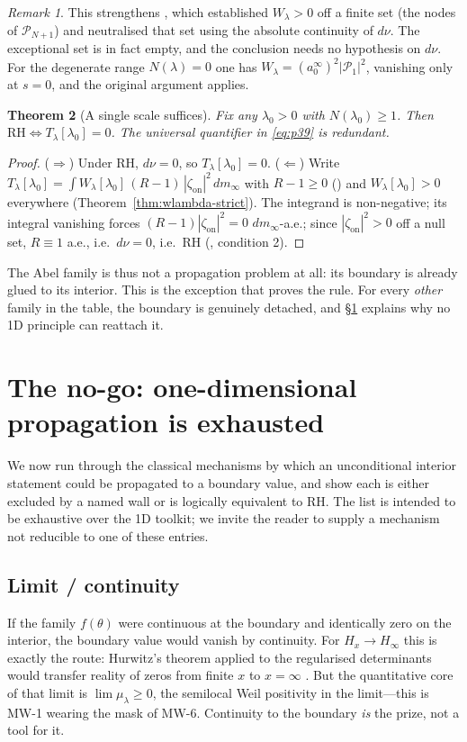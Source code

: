 \documentclass[11pt]{amsart}
\newtheorem{theorem}{Theorem}[section]
\theoremstyle{definition}
\theoremstyle{remark}
\newtheorem{remark}[theorem]{Remark}
\newcommand{\RH}{\mathrm{RH}}
\newcommand{\dm}{dm_\infty}
\newcommand{\dnu}{d\nu}
\newcommand{\Wl}{W_\lambda}
\newcommand{\Tl}{T_\lambda}
\begin{document}
\begin{remark}
This strengthens \cite[Cor.~7.5]{P40}, which established
$\Wl>0$ off a finite set (the nodes of $\mathcal{P}_{N+1}$) and neutralised
that set using the absolute continuity of $\dnu$. The exceptional set is in
fact empty, and the conclusion needs no hypothesis on $\dnu$. For the
degenerate range $N(\lambda)=0$ one has $\Wl=(a_0^\infty)^2|\mathcal{P}_1|^2$,
vanishing only at $s=0$, and the original argument applies.
\end{remark}

\begin{theorem}[A single scale suffices]\label{thm:single-scale}
Fix any $\lambda_0>0$ with $N(\lambda_0)\geq1$. Then $\RH\iff\Tl[\lambda_0]=0$.
The universal quantifier in \eqref{eq:p39} is redundant.
\end{theorem}
\begin{proof}
($\Rightarrow$) Under RH, $\dnu=0$, so $\Tl[\lambda_0]=0$. ($\Leftarrow$)
Write $\Tl[\lambda_0]=\int \Wl[\lambda_0]\,(R-1)\,|\zeta_{\mathrm{on}}|^2\,\dm$
with $R-1\geq0$ (\cite[]{P40}) and $\Wl[\lambda_0]>0$ everywhere
(Theorem~\ref{thm:wlambda-strict}). The integrand is non-negative; its
integral vanishing forces $(R-1)|\zeta_{\mathrm{on}}|^2=0$ $\dm$-a.e.; since
$|\zeta_{\mathrm{on}}|^2>0$ off a null set, $R\equiv1$ a.e., i.e.\ $\dnu=0$,
i.e.\ RH (\cite[]{P40}, condition 2).
\end{proof}

The Abel family is thus not a propagation problem at all: its boundary is
already glued to its interior. This is the exception that proves the rule.
For every \emph{other} family in the table, the boundary is genuinely
detached, and \S\ref{sec:nogo} explains why no 1D principle can reattach it.

\section{The no-go: one-dimensional propagation is exhausted}\label{sec:nogo}

We now run through the classical mechanisms by which an unconditional
interior statement could be propagated to a boundary value, and show each
is either excluded by a named wall or is logically equivalent to RH. The
list is intended to be exhaustive over the 1D toolkit; we invite the reader
to supply a mechanism not reducible to one of these entries.

\subsection{Limit / continuity}
If the family $f(\theta)$ were continuous at the boundary and identically
zero on the interior, the boundary value would vanish by continuity. For
$H_x\to H_\infty$ this is exactly the route: Hurwitz's theorem applied to
the regularised determinants would transfer reality of zeros from finite
$x$ to $x=\infty$ \cite[Prop.~5.3]{P40}. But the quantitative core
of that limit is $\lim\mu_\lambda\geq0$, the semilocal Weil positivity in
the limit---this is MW-1 wearing the mask of MW-6. Continuity to the
boundary \emph{is} the prize, not a tool for it.
\end{document}
